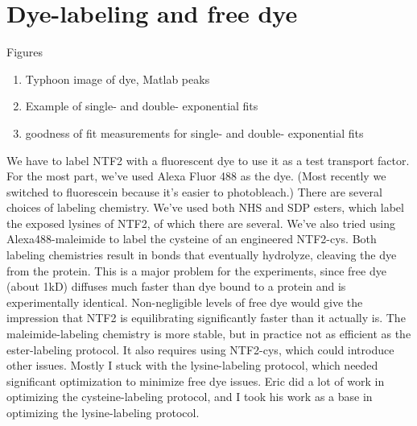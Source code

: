 \section{Dye-labeling and free dye}
\label{sec:free-dye}
Figures
\begin{enumerate}
\item Typhoon image of dye, Matlab peaks
\item Example of single- and double- exponential fits
\item goodness of fit measurements for single- and double- exponential fits
\end{enumerate}
We have to label NTF2 with a fluorescent dye to use it as a test transport factor.  For the most part, we've used Alexa Fluor 488 as the dye.  (Most recently we switched to fluorescein because it's easier to photobleach.)  There are several choices of labeling chemistry.  We've used both NHS and SDP esters, which label the exposed lysines of NTF2, of which there are several.  We've also tried using Alexa488-maleimide to label the cysteine of an engineered NTF2-cys.  Both labeling chemistries result in bonds that eventually hydrolyze, cleaving the dye from the protein.  This is a major problem for the experiments, since free dye (about 1kD) diffuses much faster than dye bound to a protein and is experimentally identical.  Non-negligible levels of free dye would give the impression that NTF2 is equilibrating significantly faster than it actually is.  The maleimide-labeling chemistry is more stable, but in practice not as efficient as the ester-labeling protocol.  It also requires using NTF2-cys, which could introduce other issues.  Mostly I stuck with the lysine-labeling protocol, which needed significant optimization to minimize free dye issues.  Eric did a lot of work in optimizing the cysteine-labeling protocol, and I took his work as a base in optimizing the lysine-labeling protocol.

